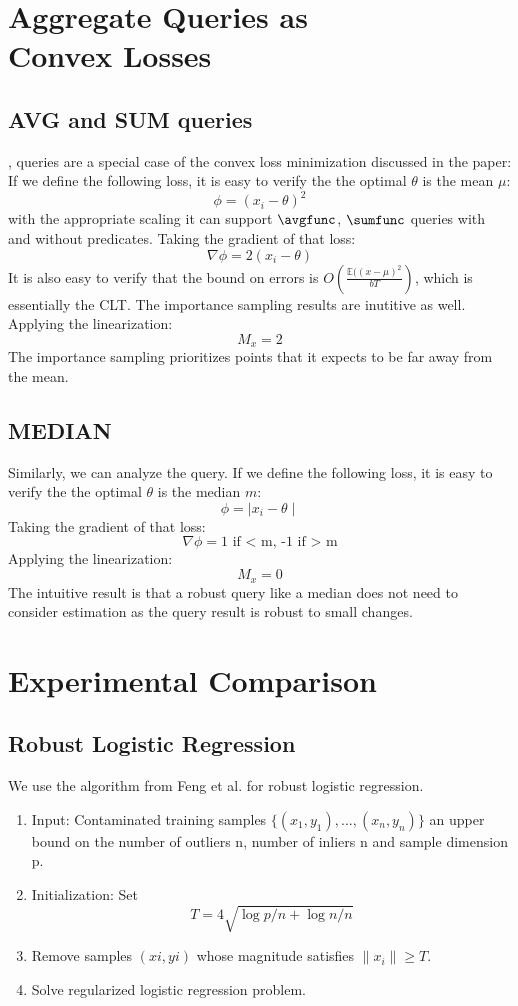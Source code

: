 \section{Aggregate Queries as \\ Convex Losses}
\subsection{AVG and SUM queries}
\avgfunc, \sumfunc queries are a special case of the convex loss minimization discussed in the paper:
If we define the following loss, it is easy to verify the the optimal $\theta$ is the mean $\mu$:
\[
\phi = (x_{i} - \theta)^2
\]
with the appropriate scaling it can support $\avgfunc$, $\sumfunc$ queries with and without predicates.
Taking the gradient of that loss:
\[
\nabla\phi = 2(x_{i} - \theta)
\]
It is also easy to verify that the bound on errors is $O(\frac{\mathbb{E}((x-\mu)^2}{bT})$, which is essentially the CLT.
The importance sampling results are inutitive as well.
Applying the linearization:
\[
M_x = 2
\]
The importance sampling prioritizes points that it expects to be far away from the mean.

\subsection{MEDIAN}
Similarly, we can analyze the \medfunc query.
If we define the following loss, it is easy to verify the the optimal $\theta$ is the median $m$:
\[
\phi = \mid x_{i} - \theta\mid
\]
Taking the gradient of that loss:
\[
\nabla\phi = \text{1 if < m, -1 if > m}
\]
Applying the linearization:
\[
M_x = 0
\]
The intuitive result is that a robust query like a median does not need to consider estimation as the query result is robust to small changes.

\section{Experimental Comparison}
\subsection{Robust Logistic Regression}\label{rlogit}
We use the algorithm from Feng et al. for robust logistic regression.
\begin{enumerate}
\item Input: Contaminated training samples $\{(x_1, y_1), . . . ,(x_{n}
, y_{n})\}$ an upper bound on the number of outliers n, number of inliers n and sample dimension p.
\item Initialization: Set \[T = 4\sqrt{\log p/n + \log n/n}\]
\item Remove samples $(xi
, yi)$ whose magnitude satisfies $\|x_i\| \ge T$.
\item Solve regularized logistic regression problem.
\end{enumerate}

